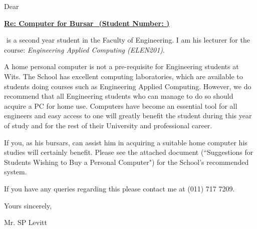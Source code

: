 \documentclass{article}
\begin{document}
\setlength{\defbaselineskip}{\baselineskip}
\newcommand{\setlinespacing}[1]%
           {\setlength{\baselineskip}{#1 \defbaselineskip}}
\def\baselinestretch{1}

\newcommand{\name}{ }
\newcommand{\studno}{}
\newcommand{\pronoun}{his } %
\newcommand{\prnoun}{him } %



\linespread{1.6}

\vspace{2cm}

Dear 

\vspace{4mm}

\centerline{\bf \underline{Re: Computer for Bursar \name (Student Number: \studno)} }

\vspace{2mm}

\setlinespacing{1.33}

\name is a second year student in the Faculty of Engineering. I am \pronoun lecturer for the course: 
\textit{Engineering Applied Computing (ELEN201)}. 

A home personal computer is not a pre-requisite for Engineering students at Wits. The School has excellent computing laboratories, which are available to students doing courses such as Engineering Applied Computing. However, we do recommend that all Engineering students who can manage to do so should acquire a PC for home use. Computers have become an essential tool for all engineers and easy access to one will greatly benefit the student during this year of study and for the rest of their University and professional career.

If you, as \pronoun bursars, can assist \prnoun in acquiring a suitable home computer \pronoun studies will certainly benefit. Please see the attached document (``Suggestions for Students Wishing to Buy a Personal Computer") for the School's recommended system.

If you have any queries regarding this please contact me at (011) 717 7209.

\vspace{7 mm}

Yours sincerely,\\  

\vspace{15mm}

Mr. SP Levitt 
\end{document}
